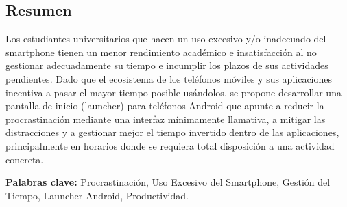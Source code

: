 \begin{center}
	\section*{Resumen}	
\end{center}

Los estudiantes universitarios que hacen un uso excesivo y/o inadecuado del smartphone tienen un menor rendimiento académico e insatisfacción al no gestionar adecuadamente su tiempo e incumplir los plazos de sus actividades pendientes. Dado que el ecosistema de los teléfonos móviles y sus aplicaciones incentiva a pasar el mayor tiempo posible usándolos, se propone desarrollar una pantalla de inicio (launcher) para teléfonos Android que apunte a reducir la procrastinación mediante una interfaz mínimamente llamativa, a mitigar las distracciones y a gestionar mejor el tiempo invertido dentro de las aplicaciones, principalmente en horarios donde se requiera total disposición a una actividad concreta.

\textbf{Palabras clave:} Procrastinación, Uso Excesivo del Smartphone, Gestión del Tiempo, Launcher Android, Productividad.
